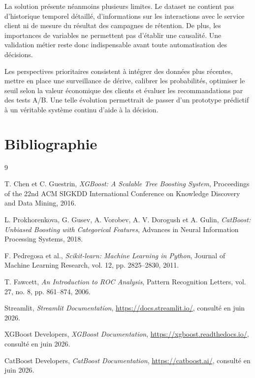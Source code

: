 \documentclass[12pt, a4paper]{article}
\begin{document}
La solution présente néanmoins plusieurs limites. Le dataset ne contient pas
d'historique temporel détaillé, d'informations sur les interactions avec le
service client ni de mesure du résultat des campagnes de rétention. De plus,
les importances de variables ne permettent pas d'établir une causalité. Une
validation métier reste donc indispensable avant toute automatisation des
décisions.

Les perspectives prioritaires consistent à intégrer des données plus récentes,
mettre en place une surveillance de dérive, calibrer les probabilités, optimiser
le seuil selon la valeur économique des clients et évaluer les recommandations
par des tests A/B. Une telle évolution permettrait de passer d'un prototype
prédictif à un véritable système continu d'aide à la décision.

\clearpage
\section*{Bibliographie}

\begin{thebibliography}{9}

T. Chen et C. Guestrin,
\textit{XGBoost: A Scalable Tree Boosting System},
Proceedings of the 22nd ACM SIGKDD International Conference on Knowledge
Discovery and Data Mining, 2016.

L. Prokhorenkova, G. Gusev, A. Vorobev, A. V. Dorogush et A. Gulin,
\textit{CatBoost: Unbiased Boosting with Categorical Features},
Advances in Neural Information Processing Systems, 2018.

F. Pedregosa et al.,
\textit{Scikit-learn: Machine Learning in Python},
Journal of Machine Learning Research, vol. 12, pp. 2825--2830, 2011.

T. Fawcett,
\textit{An Introduction to ROC Analysis},
Pattern Recognition Letters, vol. 27, no. 8, pp. 861--874, 2006.

Streamlit,
\textit{Streamlit Documentation},
\url{https://docs.streamlit.io/}, consulté en juin 2026.

XGBoost Developers,
\textit{XGBoost Documentation},
\url{https://xgboost.readthedocs.io/}, consulté en juin 2026.

CatBoost Developers,
\textit{CatBoost Documentation},
\url{https://catboost.ai/}, consulté en juin 2026.

\end{thebibliography}
\end{document}
